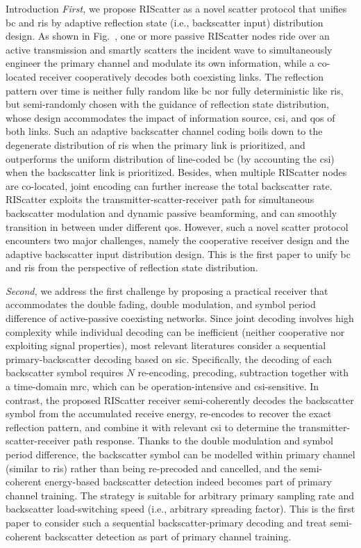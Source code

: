 \documentclass[journal,12pt,onecolumn,draftclsnofoot]{IEEEtran}
\theoremstyle{remark}
\begin{document}
\begin{section}{Introduction}
	\emph{First,} we propose RIScatter as a novel scatter protocol that unifies \gls{bc} and \gls{ris} by adaptive reflection state (i.e., backscatter input) distribution design.
	As shown in Fig.~, one or more passive RIScatter nodes ride over an active transmission and smartly scatters the incident wave to simultaneously engineer the primary channel and modulate its own information, while a co-located receiver cooperatively decodes both coexisting links.
	The reflection pattern over time is neither fully random like \gls{bc} nor fully deterministic like \gls{ris}, but semi-randomly chosen with the guidance of reflection state distribution, whose design accommodates the impact of information source, \gls{csi}, and \gls{qos} of both links.
	Such an adaptive backscatter channel coding boils down to the degenerate distribution of \gls{ris} when the primary link is prioritized, and outperforms the uniform distribution of line-coded \gls{bc} (by accounting the \gls{csi}) when the backscatter link is prioritized.
	Besides, when multiple RIScatter nodes are co-located, joint encoding can further increase the total backscatter rate.
	RIScatter exploits the transmitter-scatter-receiver path for simultaneous backscatter modulation and dynamic passive beamforming, and can smoothly transition in between under different \gls{qos}.
	However, such a novel scatter protocol encounters two major challenges, namely the cooperative receiver design and the adaptive backscatter input distribution design.
	This is the first paper to unify \gls{bc} and \gls{ris} from the perspective of reflection state distribution.

	\emph{Second,} we address the first challenge by proposing a practical receiver that accommodates the double fading, double modulation, and symbol period difference of active-passive coexisting networks.
	Since joint decoding involves high complexity while individual decoding can be inefficient (neither cooperative nor exploiting signal properties), most relevant literatures consider a sequential primary-backscatter decoding based on \gls{sic}.
	Specifically, the decoding of each backscatter symbol requires $N$ re-encoding, precoding, subtraction together with a time-domain \gls{mrc}, which can be operation-intensive and \gls{csi}-sensitive.
	In contrast, the proposed RIScatter receiver semi-coherently decodes the backscatter symbol from the accumulated receive energy, re-encodes to recover the exact reflection pattern, and combine it with relevant \gls{csi} to determine the transmitter-scatter-receiver path response.
	Thanks to the double modulation and symbol period difference, the backscatter symbol can be modelled within primary channel (similar to \gls{ris}) rather than being re-precoded and cancelled, and the semi-coherent energy-based backscatter detection indeed becomes part of primary channel training.
	The strategy is suitable for arbitrary primary sampling rate and backscatter load-switching speed (i.e., arbitrary spreading factor).
	This is the first paper to consider such a sequential backscatter-primary decoding and treat semi-coherent backscatter detection as part of primary channel training.


\end{section}
\end{document}
